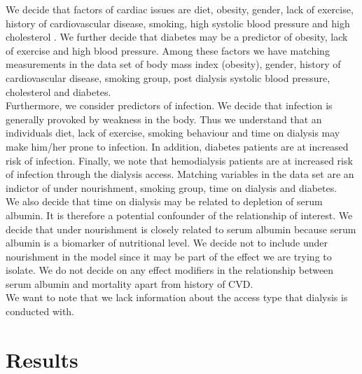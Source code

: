\documentclass[paper=a4, fontsize=11pt]{scrartcl} %
\numberwithin{equation}{section} %
\numberwithin{figure}{section} %
\numberwithin{table}{section} %
\begin{document}
We decide that factors of cardiac issues are diet, obesity, gender, lack of exercise, history of cardiovascular disease, smoking, high systolic blood pressure and high cholesterol \cite{uptodate}. We further decide that diabetes may be a predictor of obesity, lack of exercise and high blood pressure. Among these factors we have matching measurements in the data set of body mass index (obesity), gender, history of cardiovascular disease, smoking group, post dialysis systolic blood pressure, cholesterol and diabetes.\\

Furthermore, we consider predictors of infection. We decide that infection is generally provoked by weakness in the body. Thus we understand that an individuals diet, lack of exercise, smoking behaviour and time on dialysis may make him/her prone to infection. In addition, diabetes patients are at increased risk of infection. Finally, we note that hemodialysis patients are at increased risk of infection through the dialysis access. Matching variables in the data set are an indictor of under nourishment, smoking group, time on dialysis and diabetes.\\

We also decide that time on dialysis may be related to depletion of serum albumin. It is therefore a potential confounder of the relationship of interest. We decide that under nourishment is closely related to serum albumin because serum albumin is a biomarker of nutritional level. We decide not to include under nourishment in the model since it may be part of the effect we are trying to isolate. We do not decide on any effect modifiers in the relationship between serum albumin and mortality apart from history of CVD.\\
We want to note that we lack information about the access type that dialysis is conducted with.


\section{Results}
\end{document}
